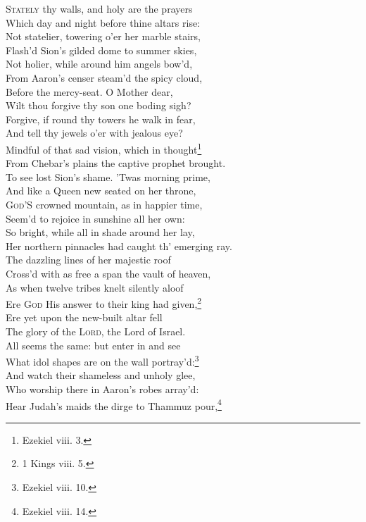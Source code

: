 \textsc{Stately} thy walls, and holy are the prayers \\
 Which day and night before thine altars rise: \\
 Not statelier, towering o’er her marble stairs, \\
 Flash’d Sion’s gilded dome to summer skies, \\
 Not holier, while around him angels bow’d, \\
 From Aaron’s censer steam’d the spicy cloud, \\
  Before the mercy-seat. O Mother dear, \\
 Wilt thou forgive thy son one boding sigh? \\
 Forgive, if round thy towers he walk in fear, \\
 And tell thy jewels o’er with jealous eye? \\
 Mindful of that sad vision, which in thought\footnote{Ezekiel viii. 3.}\\
 From Chebar’s plains the captive prophet brought. \\
  To see lost Sion’s shame. ’Twas morning prime, \\
 And like a Queen new seated on her throne, \\
 \textsc{God}’S crowned mountain, as in happier time, \\
 Seem’d to rejoice in sunshine all her own: \\
 So bright, while all in shade around her lay, \\
 Her northern pinnacles had caught th’ emerging ray. \\
  The dazzling lines of her majestic roof \\
 Cross’d with as free a span the vault of heaven, \\
 As when twelve tribes knelt silently aloof \\
 Ere \textsc{God} His answer to their king had given,\footnote{1 Kings viii. 5.} \\
 Ere yet upon the new-built altar fell \\
 The glory of the \textsc{Lord}, the Lord of Israel. \\
  All seems the same: but enter in and see \\
 What idol shapes are on the wall portray’d:\footnote{Ezekiel viii. 10.} \\
 And watch their shameless and unholy glee, \\
 Who worship there in Aaron’s robes array’d: \\
 Hear Judah’s maids the dirge to Thammuz pour,\footnote{Ezekiel viii. 14.} \\
